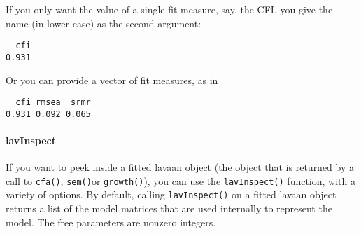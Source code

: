 If you only want the value of a single fit measure, say, the CFI, you
give the name (in lower case) as the second argument:

\begin{Shaded}
\begin{Highlighting}[]
\OtherTok{\textless{}{-}} 
\NormalTok{)}
\end{Highlighting}
\end{Shaded}

\begin{verbatim}
  cfi 
0.931 
\end{verbatim}

Or you can provide a vector of fit measures, as in

\begin{Shaded}
\begin{Highlighting}[]
\NormalTok{(}\NormalTok{,}\NormalTok{,}\NormalTok{))}
\end{Highlighting}
\end{Shaded}

\begin{verbatim}
  cfi rmsea  srmr 
0.931 0.092 0.065 
\end{verbatim}

\hypertarget{lavinspect}{%
\paragraph{lavInspect}\label{lavinspect}}

If you want to peek inside a fitted lavaan object (the object that is
returned by a call to \texttt{cfa()}, \texttt{sem()}or
\texttt{growth()}), you can use the \texttt{lavInspect()} function, with
a variety of options. By default, calling \texttt{lavInspect()} on a
fitted lavaan object returns a list of the model matrices that are used
internally to represent the model. The free parameters are nonzero
integers.

\begin{Shaded}
\begin{Highlighting}[]
\OtherTok{\textless{}{-}} 
\end{Highlighting}
\end{Shaded}

